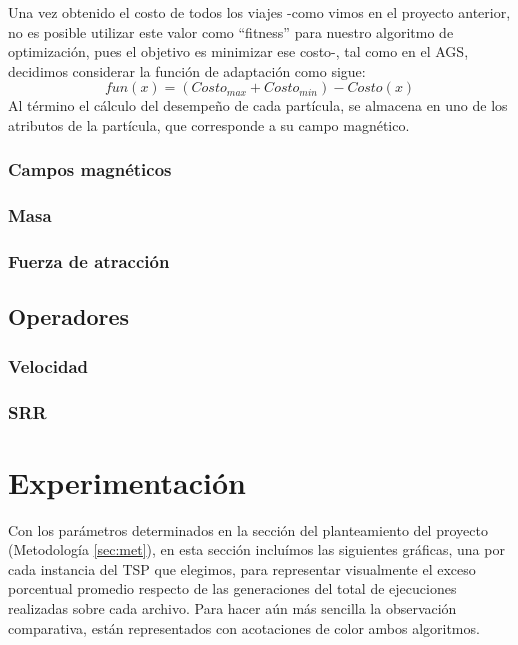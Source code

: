 \documentclass[12pt]{article}
\begin{document}
Una vez obtenido el costo de todos los viajes -como vimos en el proyecto
anterior, no es posible utilizar este valor como ``fitness'' para nuestro algoritmo de optimización, pues el objetivo es minimizar ese costo-,
tal como en el AGS, decidimos considerar la función de
adaptación como sigue:
\begin{equation}
  fun(x) = (Costo_{max} + Costo_{min})-Costo(x)
\end{equation}
Al término el cálculo del desempeño de cada partícula, se almacena en uno de los atributos de la partícula, que corresponde a su campo magnético.

\subsubsection*{Campos magnéticos}
\subsubsection*{Masa}
\subsubsection*{Fuerza de atracción}

\subsection*{Operadores}
\subsubsection*{Velocidad}\label{sec:vel}

\subsubsection*{SRR}
\newpage
\section{Experimentación}
Con los parámetros determinados en la sección del planteamiento del
proyecto (Metodología \ref{sec:met}), en esta sección incluímos las siguientes gráficas, una por cada instancia del TSP que elegimos, para representar visualmente el exceso porcentual promedio respecto de las generaciones del total de ejecuciones realizadas sobre cada archivo.
Para hacer aún más sencilla la observación comparativa, están representados con acotaciones de color ambos algoritmos.
\end{document}
